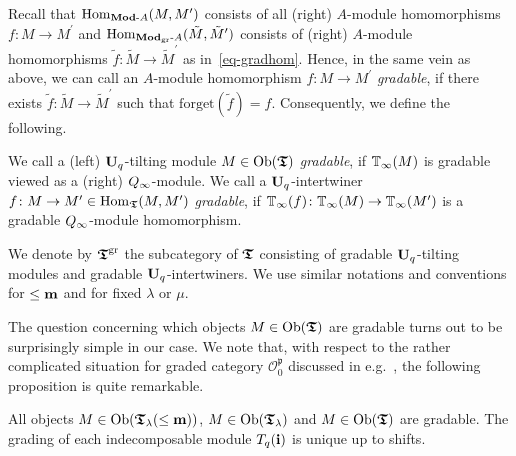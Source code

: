 Recall that $\mathrm{Hom}_{\boldsymbol{\mathrm{Mod}}\text{-}A}(M,M^{\prime})$ 
consists of all (right) $A$-module 
homomorphisms $f\colon M\to M^{\prime}$ 
and $\mathrm{Hom}_{\boldsymbol{\mathrm{Mod}}_{\mathrm{gr}}\text{-}A}(\tilde M,\tilde M^{\prime})$ 
consists of (right) $A$-module homomorphisms 
$\tilde f\colon \tilde M\to \tilde M^{\prime}$ as 
in~\eqref{eq-gradhom}. Hence, in the same vein as 
above, we can call an $A$-module homomorphism 
$f\colon M\to M^{\prime}$ \textit{gradable}, 
if there exists $\tilde f\colon\tilde M\to \tilde M^{\prime}$ 
such that $\mathrm{forget}(\tilde f)=f$.
Consequently, we define the following.






\begin{defn}\label{defn-gradable}
We call a (left) $\boldsymbol{\mathrm{U}}_q$-tilting module 
$M\in\mathrm{Ob}(\boldsymbol{\mathfrak{T}})$ \textit{gradable}, if $\mathbb{T}_{\infty}(M)$ is 
gradable viewed as a (right) $Q_{\infty}$-module. We call a 
$\boldsymbol{\mathrm{U}}_q$-intertwiner $f\colon M\to M^{\prime}\in\mathrm{Hom}_{\boldsymbol{\mathfrak{T}}}(M,M^{\prime})$ 
\textit{gradable}, if $\mathbb{T}_{\infty}(f)\colon \mathbb{T}_{\infty}(M)\to \mathbb{T}_{\infty}(M^{\prime})$ is 
a gradable $Q_{\infty}$-module homomorphism.



We denote by $\boldsymbol{\mathfrak{T}}^{\mathrm{gr}}$ the subcategory of $\boldsymbol{\mathfrak{T}}$ consisting 
of gradable $\boldsymbol{\mathrm{U}}_q$-tilting modules and gradable 
$\boldsymbol{\mathrm{U}}_q$-intertwiners. We use similar notations and 
conventions for $\leq\boldsymbol{\mathrm{m}}$ and for fixed $\lambda$ or $\mu$.
\end{defn}



The question concerning which objects $M\in\mathrm{Ob}(\boldsymbol{\mathfrak{T}})$ 
are gradable turns out to be surprisingly 
simple in our case. We note that, with respect to 
the rather complicated situation for 
graded category $\mathcal O_0^{\mathfrak{p}}$ 
discussed in e.g.~\cite[Theorem~4.1]{st2}, 
the following proposition is quite remarkable.



\begin{prop}\label{prop-grading}
All objects $M\in\mathrm{Ob}(\boldsymbol{\mathfrak{T}}_{\lambda}(\leq\boldsymbol{\mathrm{m}}))$, 
$M\in\mathrm{Ob}(\boldsymbol{\mathfrak{T}}_{\lambda})$ and $M\in\mathrm{Ob}(\boldsymbol{\mathfrak{T}})$ are gradable. The grading of 
each indecomposable module $T_q({\boldsymbol{\mathrm{i}}})$ is unique up to shifts.\makeqed
\end{prop}



